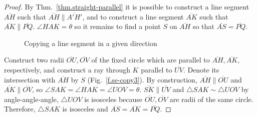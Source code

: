 \begin{proof}
By Thm.~\ref{thm.straight-parallel} it is possible to construct a line segment $\overline{AH}$ such that $\overline{AH}\parallel\overline{A'H'}$, and to construct a line segment $\overline{AK}$ such that $\overline{AK}\parallel\overline{PQ}$.
$\angle HAK=\theta$ so it remains to find a point $S$ on $\overline{AH}$ so that $\overline{AS}=\overline{PQ}$.

\begin{figure}[t]
\begin{center}
\end{center}
\caption{Copying a line segment in a given direction}\label{f.se-copy1}
\end{figure}

Construct two radii $\overline{OU}, \overline{OV}$ of the fixed circle which are parallel to $\overline{AH}, \overline{AK}$, respectively, and construct a ray through $K$ parallel to $\overline{UV}$. Denote its intersection with $\overline{AH}$ by $S$ (Fig.~\ref{f.se-copy3}). By construction, $\overline{AH}\parallel\overline{OU}$ and $\overline{AK}\parallel\overline{OV}$, so $\angle SAK=\angle HAK=\angle UOV=\theta$. $\overline{SK}\parallel\overline{UV}$ and $\triangle SAK\sim\triangle UOV$ by angle-angle-angle, $\triangle UOV$ is isosceles because $\overline{OU}, \overline{OV}$ are radii of the same circle. Therefore, $\triangle SAK$ is isosceles and $\overline{AS}=\overline{AK}=\overline{PQ}$.
\end{proof}

